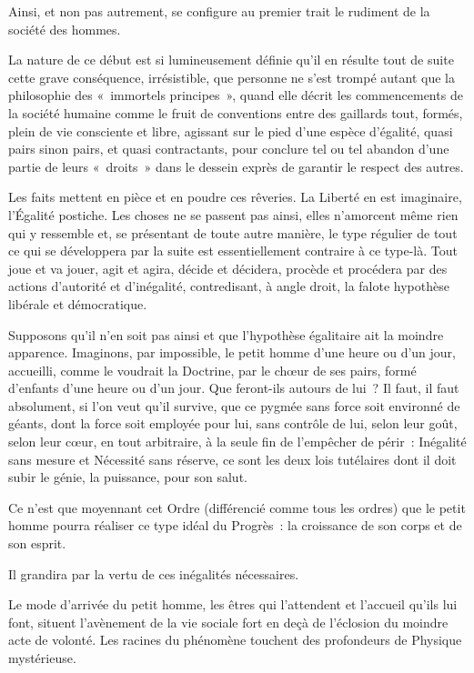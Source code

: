 \documentclass[french,twoside]{book} %
\begin{document}
Ainsi, et non pas autrement, se configure au premier trait le rudiment de la société des hommes.\par
La nature de ce début est si lumineusement définie qu’il en résulte tout de suite cette grave conséquence, irrésistible, que personne ne s’est trompé autant que la philosophie des « immortels principes », quand elle décrit les commencements de la société humaine comme le fruit de conventions entre des gaillards tout, formés, plein de vie consciente et libre, agissant sur le pied d’une espèce d’égalité, quasi pairs sinon pairs, et quasi contractants, pour conclure tel ou tel abandon d’une partie de leurs « droits » dans le dessein exprès de garantir le respect des autres.\par
Les faits mettent en pièce et en poudre ces rêveries. La Liberté en est imaginaire, l’Égalité postiche. Les choses ne se passent pas ainsi, elles n’amorcent même rien qui y ressemble et, se présentant de toute autre manière, le type régulier de tout ce qui se développera par la suite est essentiellement contraire à ce type-là. Tout joue et va jouer, agit et agira, décide et décidera, procède et procédera par des actions d’autorité et d’inégalité, contredisant, à angle droit, la falote hypothèse libérale et démocratique.\par
Supposons qu’il n’en soit pas ainsi et que l’hypothèse égalitaire ait la moindre apparence. Imaginons, par impossible, le petit homme d’une heure ou d’un jour, accueilli, comme le voudrait la Doctrine, par le chœur de ses pairs, formé d’enfants d’une heure ou d’un jour. Que feront-ils autours de lui ? Il faut, il faut absolument, si l’on veut qu’il survive, que ce pygmée sans force soit environné de géants, dont la force soit employée pour lui, sans contrôle de lui, selon leur goût, selon leur cœur, en tout arbitraire, à la seule fin de l’empêcher de périr : Inégalité sans mesure et Nécessité sans réserve, ce sont les deux lois tutélaires dont il doit subir le génie, la puissance, pour son salut.\par
Ce n’est que moyennant cet Ordre (différencié comme tous les ordres) que le petit homme pourra réaliser ce type idéal du Progrès : la croissance de son corps et de son esprit.\par
Il grandira par la vertu de ces inégalités nécessaires.\par
Le mode d’arrivée du petit homme, les êtres qui l’attendent et l’accueil qu’ils lui font, situent l’avènement de la vie sociale fort en deçà de l’éclosion du moindre acte de volonté. Les racines du phénomène touchent des profondeurs de Physique mystérieuse.\par
\end{document}
